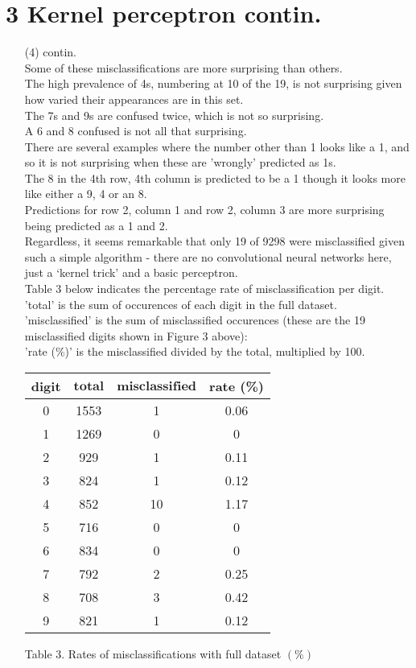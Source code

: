 \documentclass[a4paper,12pt]{article}
\begin{document}
\section*{3 Kernel perceptron contin.}
\begin{enumerate}
\item[(4)] contin.\\
Some of these misclassifications are more surprising than others. \\
The high prevalence of 4s, numbering at 10 of the 19, is not surprising given how varied their appearances are in this set.\\
The 7s and 9s are confused twice, which is not so surprising.\\
A 6 and 8 confused is not all that surprising.\\
There are several examples where the number other than 1 looks like a 1, and so it is not surprising when these are 'wrongly' predicted as 1s.\\
The 8 in the 4th row, 4th column is predicted to be a 1 though it looks more like either a 9, 4 or an 8.\\ 
Predictions for row 2, column 1 and row 2, column 3 are more surprising being predicted as a 1 and 2.\\
Regardless, it seems remarkable that only 19 of 9298 were misclassified given such a simple algorithm - there are no convolutional neural networks here, just a `kernel trick' and a basic perceptron.\\

Table 3 below indicates the percentage rate of misclassification per digit. \\
'total' is the sum of occurences of each digit in the full dataset. \\
'misclassified' is the sum of misclassified occurences (these are the 19 misclassified digits shown in Figure 3 above):\\
'rate (\%)' is the misclassified divided by the total, multiplied by 100. 

\begin{tabular}{|c|c|c|c|}
\hline
\textbf{digit}&$\textbf{total}$&$\textbf{misclassified}$&\textbf{rate} (\%)\\
\hline
0&1553&1&0.06\\
\hline
1&1269&0&0\\
\hline
2&929&1&0.11\\
\hline
3&824&1&0.12\\
\hline
4&852&10&1.17\\
\hline
5&716&0&0\\
\hline
6&834&0&0\\
\hline
7&792&2&0.25\\
\hline
8&708&3&0.42\\
\hline
9&821&1&0.12\\
\hline
\end{tabular}\par 
Table 3. Rates of misclassifications with full dataset $(\%)$

\end{enumerate}
\clearpage
\end{document}
